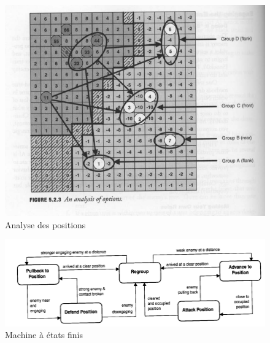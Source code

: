 \documentclass[a4paper, 11pt]{article}
\theoremstyle{definition}
\begin{document}
\begin{figure}[h]
    \centering
    \includegraphics[width=\textwidth]{screen4.png}
    \caption{Analyse des positions}
\end{figure}
\begin{figure}[h]
    \centering
    \includegraphics[width=\textwidth]{screen3.png}
    \caption{Machine à états finis}
\end{figure}
\end{document}
